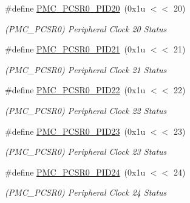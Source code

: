 \begin{DoxyCompactItemize}
\mbox{\label{group__SAMS70__PMC_ga2ac7444ae97845536c9af7cd365c3289}} 
\#define \mbox{\hyperlink{group__SAMS70__PMC_ga2ac7444ae97845536c9af7cd365c3289}{P\+M\+C\+\_\+\+P\+C\+S\+R0\+\_\+\+P\+I\+D20}}~(0x1u $<$$<$ 20)
\begin{DoxyCompactList}\small\item\em (P\+M\+C\+\_\+\+P\+C\+S\+R0) Peripheral Clock 20 Status \end{DoxyCompactList}\item 
\mbox{\label{group__SAMS70__PMC_ga00f250bdc8809d1c713a62a87af554bf}} 
\#define \mbox{\hyperlink{group__SAMS70__PMC_ga00f250bdc8809d1c713a62a87af554bf}{P\+M\+C\+\_\+\+P\+C\+S\+R0\+\_\+\+P\+I\+D21}}~(0x1u $<$$<$ 21)
\begin{DoxyCompactList}\small\item\em (P\+M\+C\+\_\+\+P\+C\+S\+R0) Peripheral Clock 21 Status \end{DoxyCompactList}\item 
\mbox{\label{group__SAMS70__PMC_ga9f9e1312fdc6c1b4306a64364fb85ab1}} 
\#define \mbox{\hyperlink{group__SAMS70__PMC_ga9f9e1312fdc6c1b4306a64364fb85ab1}{P\+M\+C\+\_\+\+P\+C\+S\+R0\+\_\+\+P\+I\+D22}}~(0x1u $<$$<$ 22)
\begin{DoxyCompactList}\small\item\em (P\+M\+C\+\_\+\+P\+C\+S\+R0) Peripheral Clock 22 Status \end{DoxyCompactList}\item 
\mbox{\label{group__SAMS70__PMC_gad403672a67189b08f3b0107c98acf5f9}} 
\#define \mbox{\hyperlink{group__SAMS70__PMC_gad403672a67189b08f3b0107c98acf5f9}{P\+M\+C\+\_\+\+P\+C\+S\+R0\+\_\+\+P\+I\+D23}}~(0x1u $<$$<$ 23)
\begin{DoxyCompactList}\small\item\em (P\+M\+C\+\_\+\+P\+C\+S\+R0) Peripheral Clock 23 Status \end{DoxyCompactList}\item 
\mbox{\label{group__SAMS70__PMC_gaa120bcc76213cd738ad4554e68551aa7}} 
\#define \mbox{\hyperlink{group__SAMS70__PMC_gaa120bcc76213cd738ad4554e68551aa7}{P\+M\+C\+\_\+\+P\+C\+S\+R0\+\_\+\+P\+I\+D24}}~(0x1u $<$$<$ 24)
\begin{DoxyCompactList}\small\item\em (P\+M\+C\+\_\+\+P\+C\+S\+R0) Peripheral Clock 24 Status \end{DoxyCompactList}\item 
$$
\end{DoxyCompactItemize}
